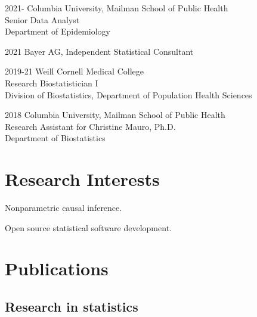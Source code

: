 \documentclass[12pt,letterpaper]{report}
\newcommand{\listitemspace}{0.15em}
\renewenvironment{itemize}
{\begin{list}{}{\setlength{\leftmargin}{0em}
            \setlength{\parskip}{0em}
            \setlength{\itemsep}{\listitemspace}
            \setlength{\parsep}{\listitemspace}}}
    {\end{list}}
\begin{document}
    \begin{tablist}
    
    	\item[2021-] \tab Columbia University, Mailman School of Public Health \\
						  Senior Data Analyst \\
						  Department of Epidemiology
						  
		\item[2021] \tab Bayer AG, Independent Statistical Consultant

        \item[2019-21] \tab Weill Cornell Medical College \\
                            Research Biostatistician I  \\
                            Division of Biostatistics, Department of Population Health Sciences 
        
        \item[2018]  \tab Columbia University, Mailman School of Public Health \\
                          Research Assistant for Christine Mauro, Ph.D. \\
                          Department of Biostatistics

    \end{tablist}

    \section*{Research Interests}

    \begin{itemize}

        \item Nonparametric causal inference.

        \item Open source statistical software development.

    \end{itemize}

    \section*{Publications}
    
    \subsection*{Research in statistics}
    
\end{document}
